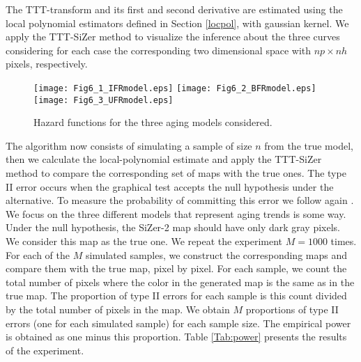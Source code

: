 \documentclass[preprint,12pt]{elsarticle}
\begin{document}
The TTT-transform and its first and second derivative are estimated using the local polynomial estimators defined in Section \ref{locpol}, with gaussian kernel. We apply the TTT-SiZer method to visualize the inference about the three curves considering for each case the corresponding two dimensional space with $np \times nh$ pixels, respectively.  

\begin{figure}[h]\centering
        \texttt{[image: Fig6\_1\_IFRmodel.eps]}
				\texttt{[image: Fig6\_2\_BFRmodel.eps]}
				\texttt{[image: Fig6\_3\_UFRmodel.eps]}
\caption{{Hazard functions for the three aging models considered}.} \label{models}
\end{figure}

The algorithm now consists of simulating a sample of size $n$ from the true model, then we calculate the local-polynomial estimate and apply the TTT-SiZer method to compare the corresponding set of maps with the true ones.
The type II error occurs when the graphical test accepts the null hypothesis under the alternative. To measure the probability of committing this error we follow again \cite{RMP07}. We focus on the three different models that represent aging trends is some way. Under the null  hypothesis, the SiZer-2 map  should have only dark gray pixels. We consider this map as the true one. We repeat the experiment $M=1000$ times.  For each of the $M$ simulated samples, we construct the corresponding maps and compare them with the true map, pixel by pixel. For each sample, we count the total number of pixels where the color in the generated map is  the same as in the true map. The proportion of type II errors for each sample is this count divided by the total number of pixels in the map. We obtain $M$ proportions of type II errors (one for each simulated sample) for each sample size. The empirical power is obtained as one minus this proportion. Table \ref{Tab:power} presents the results of the experiment.
\end{document}
